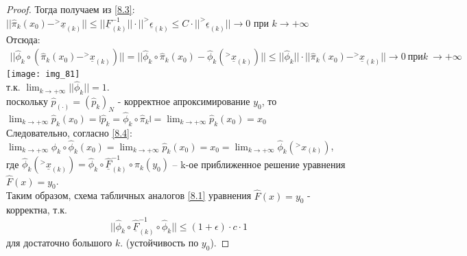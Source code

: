 \documentclass[__main__.tex]{subfiles}
\begin{document}
\begin{proof}
Тогда получаем из \ref{8.3}:\\
$|| \hat{\pi}_{k} (x_0) - ^{>}\underline{x}_{(k)}|| \leq ||\underline{F}_{(k)}^{-1}|| \cdot ||^{>} \underline{\epsilon}_{(k)} \leq C \cdot ||^{>} \underline{\epsilon}_{(k)}|| \to 0$ при $k \to + \infty$\\

Отсюда:\\
\begin{gather}
\label{8.4}
||\hat{\phi}_{k} \circ (\hat{\pi}_{k} (x_0) - ^{>} \underline{x}_{(k)})|| = ||\hat{\phi}_{k} \circ \hat{\pi}_{k} (x_0) - \hat{\phi}_{k}(^{>} \underline{x}_{(k)})|| \leq ||\hat{\phi}_{k}|| \cdot ||\hat{\pi}_{k} (x_0) - ^{>} \underline{x}_{(k)}|| \to 0 \ \text{при} k \ \to +\infty
\end{gather} 
\texttt{[image: img\_81]}\\
т.к. $\lim_{k \to +\infty} ||\hat{\phi}_{k}|| = 1$.\\
поскольку $\hat{p}_{(\cdot)} = (\hat{p}_{k})_{N}$ - корректное апроксимирование $y_0$, то $\lim_{k \to +\infty} \hat{p}_{k} (x_0) = \lvzigzag \hat{p}_{k} = \hat{\phi}_{k} \circ \hat{\pi}_{k} \rvzigzag = \lim_{k \to +\infty} \hat{p}_{k} (x_0) = x_0$\\

Следовательно, согласно \ref{8.4}:\\
$\lim_{k \to +\infty} \hat{\phi}_{k} \circ \hat{\phi}_{k} (x_0) = \lim_{k \to +\infty} \hat{p}_{k} (x_0) = x_0 = \lim_{k \to +\infty} \hat{\phi}_{k} (^{>}x_{(k)})$,\\
где $\hat{\phi}_{k} (^{>}\underline{x}_{(k)}) = \hat{\phi}_{k} \circ \underline{\hat{F}}_{(k)}^{-1} \circ \hat{\pi}_{k} (y_0)$ -- k-ое приближенное решение уравнения $\hat{F}(x) = y_0$.\\

Таким образом, схема табличных аналогов \ref{8.1} уравнения $\hat{F}(x) = y_0$ - корректна, т.к.
$$
||\hat{\phi}_{k} \circ \underline{\hat{F}}_{(k)}^{-1} \circ \hat{\phi}_{k}||  \leq (1+\epsilon)\cdot c \cdot 1
$$
для достаточно большого $k$. (устойчивость по $y_0$).
\end{proof}
\end{document}
